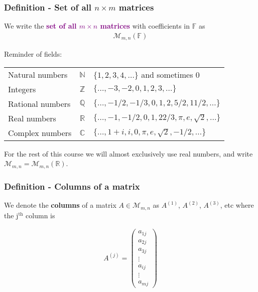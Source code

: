 \documentclass[usenames,dvipsnames,aspectratio=169,10pt]{beamer}
\numberwithin{equation}{section}
\begin{document}
\begin{frame}
\frametitle{Definition - Set of all $n \times m$ matrices}

We write the \textbf{\textcolor{Purple}{set of all $m \times n$ matrices}} with coefficients in $\mathbb{F}$ as
\begin{align*}
\mathcal{M}_{m,n}(\mathbb{F})
\end{align*}

Reminder of fields:
\begin{table}
\begin{tabular}{lcl}
Natural numbers  & $\mathbb{N}$ & $\{1,2,3,4,\dots\}$ and sometimes 0 \\
Integers         & $\mathbb{Z}$ & $\{\dots,-3,-2,0,1,2,3,\dots\}$ \\
Rational numbers & $\mathbb{Q}$ & $\{\dots,-1/2,-1/3,0,1,2,5/2,11/2,\dots\}$ \\
Real numbers     & $\mathbb{R}$ & $\{\dots,-1,-1/2,0,1,22/3,\pi,e,\sqrt{2},\dots\}$ \\
Complex numbers  & $\mathbb{C}$ & $\{\dots,1+i,i,0,\pi,e,\sqrt{2},-1/2,\dots\}$ 
\end{tabular}
\end{table}

For the rest of this course we will almost exclusively use real numbers, and write $\mathcal{M}_{m,n} = \mathcal{M}_{m,n}(\mathbb{R})$.
\end{frame}







\begin{frame}
\frametitle{Definition - Columns of a matrix}

We denote the \textbf{columns} of a matrix $A \in \mathcal{M}_{m,n}$ as $A^{(1)}$, $A^{(2)}$, $A^{(3)}$, etc where the j$^\text{th}$ column is

\begin{align*}
A^{(j)} =
\begin{pmatrix}
 a_{1j} \\
 a_{2j} \\
 a_{3j} \\
 \vdots \\
 a_{ij} \\
 \vdots \\
 a_{mj}
\end{pmatrix}
\end{align*}

\end{frame}
\end{document}
